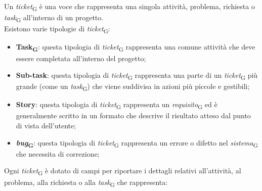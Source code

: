 Un \textit{ticket}\textsubscript{G} è una voce che rappresenta una singola attività, problema, richiesta o \textit{task}\textsubscript{G} all'interno di un progetto. \\
Esistono varie tipologie di \textit{ticket}\textsubscript{G}:
\begin{itemize}
    \item \textbf{Task\textsubscript{G}}: questa tipologia di \textit{ticket}\textsubscript{G} rappresenta una comune attività che deve essere completata all'interno del progetto;
    \item \textbf{Sub-task}: questa tipologia di \textit{ticket}\textsubscript{G} rappresenta una parte di un \textit{ticket}\textsubscript{G} più grande (come un \textit{task}\textsubscript{G}) che viene suddivisa in azioni più piccole e gestibili;
    \item \textbf{Story}: questa tipologia di \textit{ticket}\textsubscript{G} rappresenta un \textit{requisito}\textsubscript{G} ed è generalmente scritto in un formato che descrive il risultato atteso dal punto di vista dell'utente;
    \item \textbf{\textit{bug}\textsubscript{G}}: questa tipologia di \textit{ticket}\textsubscript{G} rappresenta un errore o difetto nel \textit{sistema}\textsubscript{G} che necessita di correzione;
\end{itemize}
Ogni \textit{ticket}\textsubscript{G} è dotato di campi per riportare i dettagli relativi all'attività, al problema, alla richiesta o alla \textit{task}\textsubscript{G} che rappresenta:
